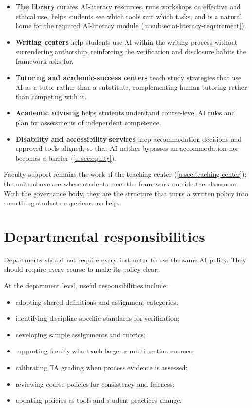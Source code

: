 \documentclass{SIAMbook2023}
\begin{document}
\begin{itemize}
  \item \textbf{The library} curates AI-literacy resources, runs workshops on effective and ethical use, helps students see which tools suit which tasks, and is a natural home for the required AI-literacy module (\cref{u:subsec:ai-literacy-requirement}).
  \item \textbf{Writing centers} help students use AI within the writing process without surrendering authorship, reinforcing the verification and disclosure habits the framework asks for.
  \item \textbf{Tutoring and academic-success centers} teach study strategies that use AI as a tutor rather than a substitute, complementing human tutoring rather than competing with it.
  \item \textbf{Academic advising} helps students understand course-level AI rules and plan for assessments of independent competence.
  \item \textbf{Disability and accessibility services} keep accommodation decisions and approved tools aligned, so that AI neither bypasses an accommodation nor becomes a barrier (\cref{u:sec:equity}).
\end{itemize}

Faculty support remains the work of the teaching center (\cref{u:sec:teaching-center}); the units above are where students meet the framework outside the classroom. With the governance body, they are the structure that turns a written policy into something students experience as help.

\section{Departmental responsibilities}
\label{u:sec:department}%

Departments should not require every instructor to use the same AI policy. They should require every course to make its policy clear.

At the department level, useful responsibilities include:

\begin{itemize}
  \item adopting shared definitions and assignment categories;
  \item identifying discipline-specific standards for verification;
  \item developing sample assignments and rubrics;
  \item supporting faculty who teach large or multi-section courses;
  \item calibrating TA grading when process evidence is assessed;
  \item reviewing course policies for consistency and fairness;
  \item updating policies as tools and student practices change.
\end{itemize}
\end{document}
